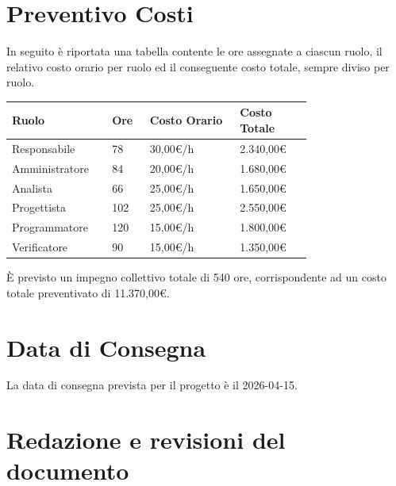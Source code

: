 \documentclass[a4paper,12pt]{article}
\begin{document}
\section{Preventivo Costi}
In seguito è riportata una tabella contente le ore assegnate a ciascun ruolo, il relativo costo orario per ruolo ed il conseguente costo totale, sempre diviso per ruolo.
\begin{center}
    \small
    \renewcommand{\arraystretch}{1.2} 
    \begin{tabular}{|p{0.20\linewidth}|p{0.10\linewidth}|p{0.25\linewidth}|p{0.20\linewidth}|}
        \hline
        \rowcolor{gray!60} 
        \textbf{Ruolo} & \textbf{Ore} & \textbf{Costo Orario} & \textbf{Costo Totale} \\
        \hline
        \rowcolor{white}
        Responsabile & 78 & 30,00€/h & 2.340,00€\\
        \hline
        \rowcolor{gray!20}
        Amministratore & 84 & 20,00€/h & 1.680,00€\\
        \hline
        \rowcolor{white}
        Analista & 66 & 25,00€/h & 1.650,00€\\
        \hline
        \rowcolor{gray!20}
        Progettista & 102 & 25,00€/h & 2.550,00€\\
        \hline
        \rowcolor{white}
        Programmatore & 120 & 15,00€/h & 1.800,00€\\
        \hline
        \rowcolor{gray!20}
        Verificatore & 90 & 15,00€/h & 1.350,00€\\
        \hline
    \end{tabular}
\end{center}
È previsto un impegno collettivo totale di 540 ore, corrispondente ad un costo totale preventivato di 11.370,00€. 

\section{Data di Consegna}
La data di consegna prevista per il progetto è il 2026-04-15.

\clearpage
\section{Redazione e revisioni del documento}
\end{document}
